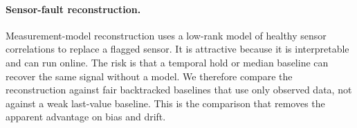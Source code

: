 \paragraph{Sensor-fault reconstruction.}
Measurement-model reconstruction uses a low-rank model of healthy sensor
correlations to replace a flagged sensor. It is attractive because it is
interpretable and can run online. The risk is that a temporal hold or median
baseline can recover the same signal without a model. We therefore compare the
reconstruction against fair backtracked baselines that use only observed data,
not against a weak last-value baseline. This is the comparison that removes the
apparent advantage on bias and drift.

